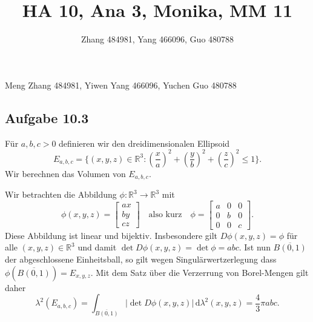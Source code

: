 \documentclass[draft,a5paper]{article}
\title{HA 10, Ana 3, Monika, MM 11}
\author{Zhang 484981, Yang 466096, Guo 480788}
\providecommand{\abs}[1]{\left\lvert#1\right\rvert}
\theoremstyle{remark}
\newcommand{\dd}{\,\mathrm{d}}
\begin{document}
\maketitle
\begin{center}
  Meng Zhang 484981, Yiwen Yang 466096, Yuchen Guo 480788
\end{center}
\subsection{Aufgabe 10.3}
Für \(a, b, c > 0\) definieren wir den dreidimensionalen Ellipsoid
\[
  E_{a, b, c} = \{(x, y, z) \in \mathbb{R}^{3} \colon \left(\frac{x}{a}\right)^{2}
  + \left(\frac{y}{b}\right)^{2}
  + \left(\frac{z}{c}\right)^{2}
  \le 1\}.
\]
Wir berechnen das Volumen von \(E_{a,b,c}\).

Wir betrachten die Abbildung \(\phi\colon \mathbb{R}^{3} \to \mathbb{R}^{3}\) mit
\[
  \phi(x,y,z) =
  \begin{bmatrix}
    ax \\ by \\ cz
  \end{bmatrix}
  \quad \text{also kurz} \quad
  \phi =
  \begin{bmatrix}
    a & 0 & 0 \\
    0 & b & 0 \\
    0 & 0 & c
  \end{bmatrix}.
\]
Diese Abbildung ist linear und bijektiv.  Insbesondere gilt \(D\phi(x,y,z)
= \phi\) für alle \((x,y,z) \in \mathbb{R}^{3}\) und damit \(\det D\phi(x,y,z) = \det \phi =
abc\).  Ist nun \(\overline{B(0,1)}\) der abgeschlossene Einheitsball, so
gilt wegen Singulärwertzerlegung dass
\(\phi(\overline{B(0,1)})=E_{x,y,z}\).  Mit dem Satz über die Verzerrung
von Borel-Mengen gilt daher
\[
  \lambda^{2}(E_{a,b,c}) = \int_{\overline{B(0,1)}}\abs{\det D\phi(x,y,z)} \dd
  \lambda^{2}(x,y,z) = \frac43 \pi abc.
\]
\end{document}
